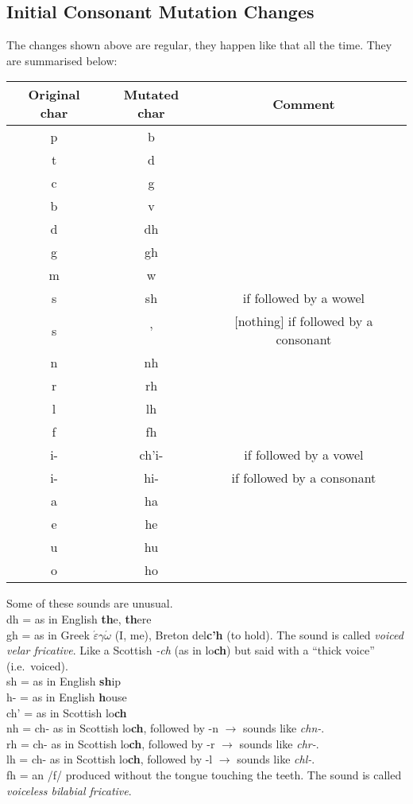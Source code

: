 \subsection{Initial Consonant Mutation Changes}
The changes shown above are regular, they happen like that all the time. They are summarised below:
\begin{table}[H]
\centering
\begin{tabular}{c|c|c}
  \textbf{Original char} & \textbf{Mutated char} & \textbf{Comment}\\
  \toprule
  p & b & \\
  t & d & \\
  c & g & \\
  b & v & \\
  d & dh & \\
  g & gh & \\
  m & w & \\
  s & sh & if followed by a wowel\\
  s & ' & $[$nothing$]$ if followed by a consonant\\
  n & nh & \\
  r & rh & \\
  l & lh & \\
  f & fh & \\
  i- & ch'i- & if followed by a vowel\\
  i- & hi- & if followed by a consonant\\
  a & ha & \\
  e & he & \\
  u & hu & \\
  o & ho &
\end{tabular}
\label{summary_mutated_chars}
\end{table}

Some of these sounds are unusual.\\
dh = as in English \textbf{th}e, \textbf{th}ere\\
gh = as in Greek $\acute{\varepsilon}$\textbf{$\gamma$}$\acute{\omega}$ (I, me), Breton del\textbf{c'h} (to hold). The sound is called \textit{voiced velar fricative}. Like a Scottish \textit{-ch} (as in lo\textbf{ch}) but said with a ``thick voice'' (i.e.\ voiced).\\
sh = as in English \textbf{sh}ip\\
h- = as in English \textbf{h}ouse\\
ch' = as in Scottish lo\textbf{ch}\\
nh = ch- as in Scottish lo\textbf{ch}, followed by -n $\rightarrow$ sounds like \textit{chn-}.\\
rh = ch- as in Scottish lo\textbf{ch}, followed by -r $\rightarrow$ sounds like \textit{chr-}.\\
lh = ch- as in Scottish lo\textbf{ch}, followed by -l $\rightarrow$ sounds like \textit{chl-}.\\
fh = an /f/ produced without the tongue touching the teeth. The sound is called \textit{voiceless bilabial fricative}.\\

